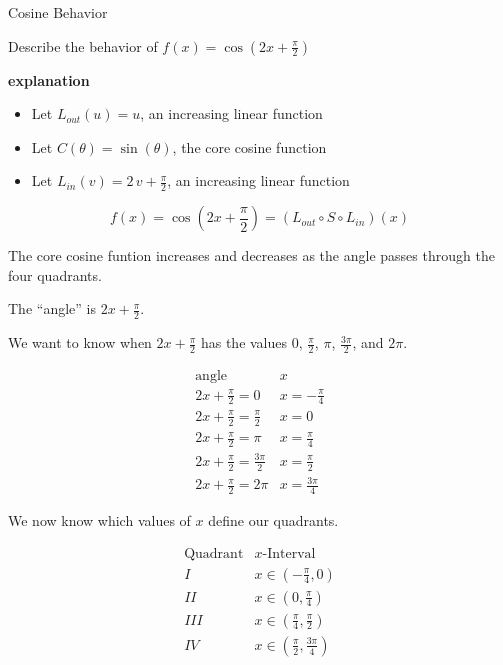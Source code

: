 \documentclass{ximera}
\begin{document}
\begin{example} Cosine Behavior

Describe the behavior of   $f(x) = \cos\left( 2 x + \frac{\pi}{2} \right)$



\textbf{\textcolor{red!75!green}{explanation}} 






\begin{itemize}
\item Let $L_{out}(u) = u$, an increasing linear function
\item Let $C(\theta) = \sin(\theta)$, the core cosine function
\item Let $L_{in}(v) = 2 \, v + \frac{\pi}{2}$, an increasing linear function
\end{itemize}


\[
f(x) = \cos\left( 2 x + \frac{\pi}{2} \right) = (L_{out} \circ S \circ L_{in})(x)
\]


The core cosine funtion increases and decreases as the angle passes through the four quadrants.


The ``angle'' is $2 x + \frac{\pi}{2}$.

We want to know when $2 x + \frac{\pi}{2}$ has the values $0$, $\frac{\pi}{2}$, $\pi$, $\frac{3\pi}{2}$, and $2\pi$.






\[
\begin{array}{l|l}
\text{angle}                  & x  \\ \hline
2 x + \frac{\pi}{2} = 0        & x = -\frac{\pi}{4}  \\
2 x + \frac{\pi}{2} = \frac{\pi}{2}      &  x = 0 \\
2 x + \frac{\pi}{2} = \pi      & x = \frac{\pi}{4}  \\
2 x + \frac{\pi}{2} = \frac{3\pi}{2}     & x = \frac{\pi}{2}   \\
2 x + \frac{\pi}{2} = 2\pi     & x = \frac{3\pi}{4}
\end{array}
\]


We now know which values of $x$ define our quadrants.





\[
\begin{array}{l|l}
\text{Quadrant}                  & x\text{-Interval}  \\  \hline
I        & x \in  \left( -\frac{\pi}{4}, 0 \right)  \\
II       & x \in  \left( 0, \frac{\pi}{4} \right) \\
III      & x \in  \left( \frac{\pi}{4}, \frac{\pi}{2} \right)  \\
IV       & x \in  \left( \frac{\pi}{2}, \frac{3\pi}{4} \right)   \\
\end{array}
\]




\end{example}
\end{document}
